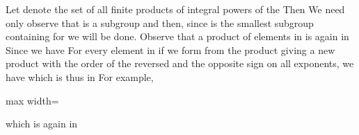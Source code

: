 \documentclass[11pt,oneside]{article}
\begin{document}
\begin{BookBody}
 Let  denote the set of all finite products of integral powers of the  Then  We need only observe that  is a subgroup and then, since  is the smallest subgroup containing  for  we will be done. Observe that a product of elements in  is again in  Since  we have  For every element  in  if we form from the product giving  a new product with the order of the  reversed and the opposite sign on all exponents, we have  which is thus in  For example,

\begin{center}\begin{adjustbox}{max width=\linewidth}\end{adjustbox}\end{center}

\noindent which is again in  \BookEnd{\blacklozenge}

\end{BookBody}

\BookNarrativetrue
\end{document}

